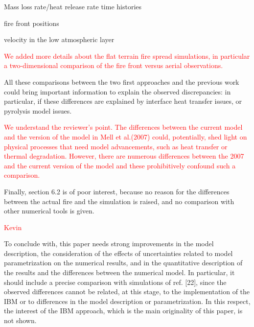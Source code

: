 \documentclass[12pt]{article}
\newcommand\hl[1]{\textcolor{red}{#1}}
\begin{document}
Mass loss rate/heat release rate time histories

fire front positions

velocity in the low atmospheric layer

\hl{We added more details about the flat terrain fire spread simulations, in particular a two-dimensional comparison of the fire front versus aerial observations.}

All these comparisons between the two first approaches and the previous work could bring
important information to explain the observed discrepancies: in particular, if these differences
are explained by interface heat transfer issues, or pyrolysis model issues.

\hl{We understand the reviewer's point. The differences between the current model and the version of the model in Mell et al.(2007) could, potentially, shed light on physical processes that need model advancements, such as heat transfer or thermal degradation. However, there are numerous differences between the 2007 and the current version of the model and these prohibitively confound such a comparison.}

Finally, section 6.2 is of poor interest, because no reason for the differences between the actual
fire and the simulation is raised, and no comparison with other numerical tools is given.

\hl{Kevin}

To conclude with, this paper needs strong improvements in the model description, the
consideration of the effects of uncertainties related to model parametrization on the numerical
results, and in the quantitative description of the results and the differences between the
numerical model. In particular, it should include a precise comparison with simulations of ref.
[22], since the observed differences cannot be related, at this stage, to the implementation of the
IBM or to differences in the model description or parametrization. In this respect, the interest of
the IBM approach, which is the main originality of this paper, is not shown.
\end{document}

